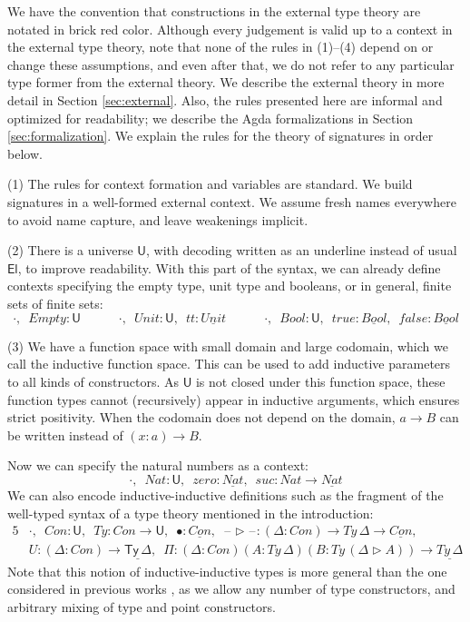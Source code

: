 \documentclass[dvipsnames]{lmcs} %
\newcommand{\U}{\mathsf{U}}
\newcommand{\El}{\mathsf{El}}
\newcommand{\ra}{\rightarrow}
\newcommand{\Ty}{\mathsf{Ty}}
\newcommand{\blank}{\mathord{\hspace{1pt}\text{--}\hspace{1pt}}}
\newcommand{\1}{\mathsf{1}} \renewcommand{\Pr}{\mathsf{Pr}}
\theoremstyle{plain}\newtheorem{satz}[thm]{Satz} %
\begin{document}
We have the convention that constructions in the external type theory are
notated in {\color{BrickRed}brick red} color. Although every judgement is valid
up to a context in the external type theory, note that none of the rules in
(1)--(4) depend on or change these assumptions, and even after that, we do not
refer to any particular type former from the external theory. We describe the
external theory in more detail in Section \ref{sec:external}. Also, the rules
presented here are informal and optimized for readability; we describe the Agda
formalizations in Section \ref{sec:formalization}. We explain the rules for the
theory of signatures in order below.

(1) The rules for context formation and variables are standard. We build
signatures in a well-formed external context.  We assume fresh names everywhere
to avoid name capture, and leave weakenings implicit.

(2) There is a universe $\U$, with decoding written as an underline instead of
usual $\El$, to improve readability. With this part of the syntax, we can already
define contexts specifying the empty type, unit type and booleans, or in general,
finite sets of finite sets:
\[
\boldsymbol{\cdot},\,\,\,Empty:\U \hspace{3em} \boldsymbol{\cdot},\,\,\,Unit:\U,\,\,\,tt:\underline{Unit} \hspace{3em} \boldsymbol{\cdot},\,\,\,Bool:\U,\,\,\,true:\underline{Bool},\,\,\,false:\underline{Bool}
\]

(3) We have a function space with small domain and large codomain, which we call
the inductive function space. This can be used to add inductive parameters to all
kinds of constructors. As $\U$ is not closed under this function space, these
function types cannot (recursively) appear in inductive arguments, which ensures
strict positivity. When the codomain does not depend on the domain, $a\ra B$ can
be written instead of $(x:a)\ra B$.

Now we can specify the natural numbers as a context:
\[
\boldsymbol{\cdot},\,\,\,Nat : \U,\,\,\,zero:\underline{Nat},\,\,\,suc:Nat\ra\underline{Nat}
\]
We can also encode inductive-inductive definitions such as the
fragment of the well-typed syntax of a type theory mentioned in the
introduction:
\begin{alignat*}{5}
  & \boldsymbol{\cdot},\,\,\,Con:\U,\,\,\,Ty:Con\ra\U,\,\,\,\bullet:\underline{Con},\,\,\,\blank\rhd\blank:(\Delta:Con)\ra Ty\,\Delta\ra\underline{Con}, \\
  & U : (\Delta:Con)\ra \underline{\Ty\,\Delta},\,\,\,\Pi:(\Delta:Con)(A:Ty\,\Delta)(B:Ty\,(\Delta\rhd A))\ra\underline{Ty\,\Delta}
\end{alignat*}
Note that this notion of inductive-inductive types is more general than the one
considered in previous works \cite{forsberg-phd}, as we allow any number of type
constructors, and arbitrary mixing of type and point constructors.
\end{document}
